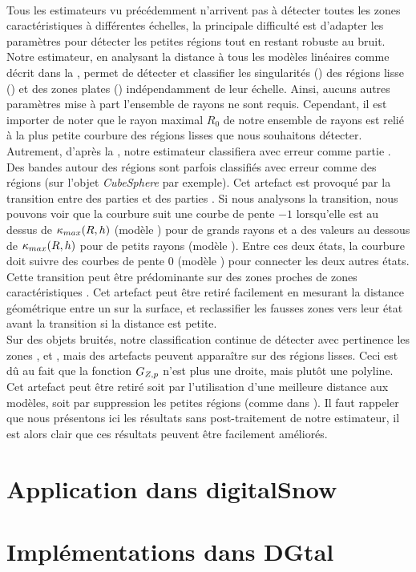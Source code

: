 \paragraph{}
%
Tous les estimateurs vu précédemment n'arrivent pas à détecter toutes les zones
caractéristiques à différentes échelles, la principale difficulté est d'adapter
les paramètres pour détecter les petites régions tout en restant robuste au
bruit. Notre estimateur, en analysant la distance à tous les modèles linéaires
comme décrit dans la ,
permet de détecter et classifier les singularités (\featedge) des régions lisse
(\featsmooth) et des zones plates (\featflat) indépendamment de leur échelle.
Ainsi, aucuns autres paramètres mise à part l'ensemble de rayons ne sont requis.
Cependant, il est importer de noter que le rayon maximal $R_0$ de notre ensemble
de rayons est relié à la plus petite courbure des régions lisses que nous
souhaitons détecter. Autrement, d'après la , notre
estimateur classifiera avec erreur comme partie \featflat.
%
\\
%
Des bandes autour des régions \featedge sont parfois classifiés avec erreur
comme des régions \featsmooth (sur l'objet \emph{CubeSphere} par exemple). Cet
artefact est provoqué par la transition entre des parties \featflat et des
parties \featedge. Si nous analysons la transition, nous pouvons voir que la
courbure suit une courbe de pente $-1$ lorsqu'elle est au dessus de
$\kappa_{max}(R,h)$ (modèle \featedge) pour de grands rayons et a des valeurs au
dessous de $\kappa_{max}(R,h)$ pour de petits rayons (modèle \featflat). Entre ces
deux états, la courbure doit suivre des courbes de pente $0$ (modèle
\featsmooth) pour connecter les deux autres états. Cette transition peut être
prédominante sur des zones proches de zones caractéristiques \featedge. Cet
artefact peut être retiré facilement en mesurant la distance géométrique entre
un \featedge sur la surface, et reclassifier les fausses zones \featsmooth vers
leur état avant la transition si la distance est petite.
%
\\
%
Sur des objets bruités, notre classification continue de détecter avec
pertinence les zones \featedge, \featsmooth et \featflat, mais des artefacts
peuvent apparaître sur des régions lisses. Ceci est dû au fait que la fonction
$G_{Z,p}$ n'est plus une droite, mais plutôt une polyline. Cet artefact peut
être retiré soit par l'utilisation d'une meilleure distance aux modèles, soit
par suppression les petites régions \featedge (comme dans \cite{Park2012}). Il
faut rappeler que nous présentons ici les résultats sans post-traitement de
notre estimateur, il est alors clair que ces résultats peuvent être facilement
améliorés.
%
%
\section{Application dans digitalSnow}%
\label{sec:applications:digitalsnow}
%
\section{Implémentations dans DGtal}%
\label{sec:applications:dgtal}
%

